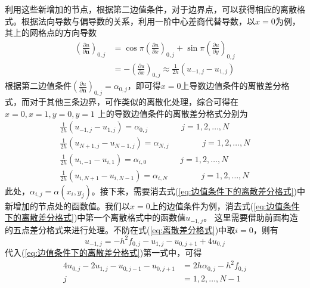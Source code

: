              利用这些新增加的节点，根据第二边值条件，对于边界点，可以获得相应的离散格式。根据法向导数与偏导数的关系，利用一阶中心差商代替导数，以$x=0$为例，其上的网格点的方向导数
            \begin{equation*}
            \begin{split}
            {\left(\frac{\partial u}{\partial \mathbf{n}}\right)_{0,j}} &= {\cos \pi} {\left( \frac{\partial u}{\partial x} \right)_{0,j}} + {\sin \pi} {\left( \frac{\partial u}{\partial y}\right)_{0,j}}\\
            &= {-\left( \frac{\partial u}{\partial x}\right)_{0,j}} \approx \frac{1}{2h}( {u_{ - 1,j} - {u_{1,j}}})
            \end{split}
            \end{equation*}
            根据第二边值条件${\left( {\frac{{\partial u}}{{\partial \mathbf{n}}}} \right)_{0,j}} = {\alpha _{0,j}}$，即可得$x=0$上导数边值条件的离散差分格式，而对于其他三条边界，可作类似的离散化处理，综合可得在$x=0,x=1,y=0,y=1$ 上的导数边值条件的离散差分格式分别为
            \begin{equation}\label{eq:边值条件下的离散差分格式}
            \begin{split}
            \frac{1}{{2h}}\left( {{u_{ - 1,j}} - {u_{1,j}}} \right) = {\alpha _{0,j}}\qquad\qquad j=1,2,\ldots,N\\
            \frac{1}{{2h}}\left( {{u_{ N+1,j}} - {u_{N-1,j}}} \right) = {\alpha _{N,j}}\qquad\qquad j=1,2,\ldots,N\\
            \frac{1}{{2h}}\left( {{u_{ i,-1}} - {u_{i,1}}} \right) = {\alpha _{i,0}}\qquad\qquad j=1,2,\ldots,N\\
            \frac{1}{{2h}}\left( {{u_{ i,N+1}} - {u_{i,N-1}}} \right) = {\alpha _{i,N}}\qquad\qquad j=1,2,\ldots,N
            \end{split}
            \end{equation}
             此处，${\alpha _{i,j}}=\alpha(x_i,y_j)$。接下来，需要消去式(\ref{eq:边值条件下的离散差分格式})中新增加的节点处的函数值。我们以$x=0$上的边值条件为例，消去式(\ref{eq:边值条件下的离散差分格式})中第一个离散格式中的函数值$u_{-1,j}$。 这里需要借助前面构造的五点差分格式来进行处理。不防在式(\ref{eq:离散差分格式})中取$i=0$，则有
             \[{u_{ - 1,j}} =  - {h^2}{f_{0,j}} - {u_{1,j}} - {u_{0,j + 1}} + 4{u_{0,j}}\]
             代入(\ref{eq:边值条件下的离散差分格式})第一式中，可得
            \begin{equation}\label{eq:x=0上的差分格式}
            \begin{split}
            4{u_{0,j}} - 2{u_{1,j}} - {u_{0,j - 1}} - {u_{0,j + 1}} &= 2h{\alpha _{0,j}} - {h^2}{f_{0,j}}\\
            j &= 1,2,\ldots,N-1
            \end{split}
            \end{equation}
